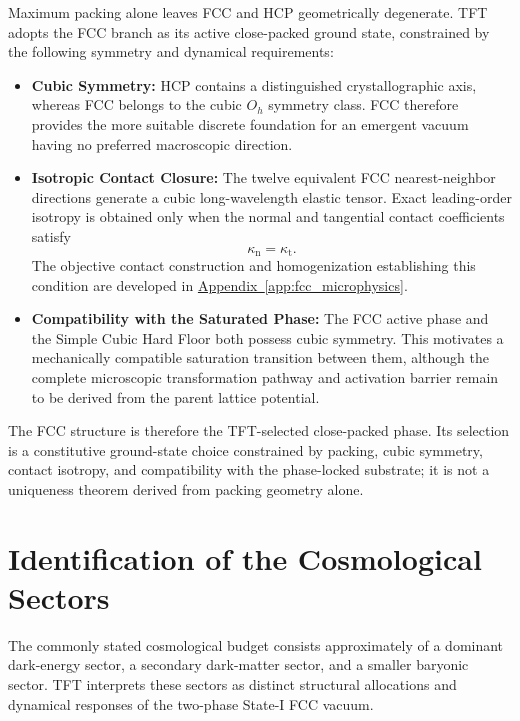 Maximum packing alone leaves FCC and HCP geometrically degenerate. TFT adopts the FCC branch as its active close-packed ground state, constrained by the following symmetry and dynamical requirements:
\begin{itemize}
    \item \textbf{Cubic Symmetry:}
    HCP contains a distinguished crystallographic axis, whereas FCC belongs to the cubic $O_h$ symmetry class. FCC therefore provides the more suitable discrete foundation for an emergent vacuum having no preferred macroscopic direction.

    \item \textbf{Isotropic Contact Closure:}
    The twelve equivalent FCC nearest-neighbor directions generate a cubic long-wavelength elastic tensor. Exact leading-order isotropy is obtained only when the normal and tangential contact coefficients satisfy
    \begin{equation}
        \kappa_{\mathrm{n}} = \kappa_{\mathrm{t}}.
    \end{equation}
    The objective contact construction and homogenization establishing this condition are developed in \hyperref[app:fcc_microphysics]{Appendix~\ref*{app:fcc_microphysics}}.

    \item \textbf{Compatibility with the Saturated Phase:}
    The FCC active phase and the Simple Cubic Hard Floor both possess cubic symmetry. This motivates a mechanically compatible saturation transition between them, although the complete microscopic transformation pathway and activation barrier remain to be derived from the parent lattice potential.
\end{itemize}

The FCC structure is therefore the TFT-selected close-packed phase. Its selection is a constitutive ground-state choice constrained by packing, cubic symmetry, contact isotropy, and compatibility with the phase-locked substrate; it is not a uniqueness theorem derived from packing geometry alone.

\section{Identification of the Cosmological Sectors}

The commonly stated cosmological budget consists approximately of a dominant dark-energy sector, a secondary dark-matter sector, and a smaller baryonic sector. TFT interprets these sectors as distinct structural allocations and dynamical responses of the two-phase State-I FCC vacuum.

